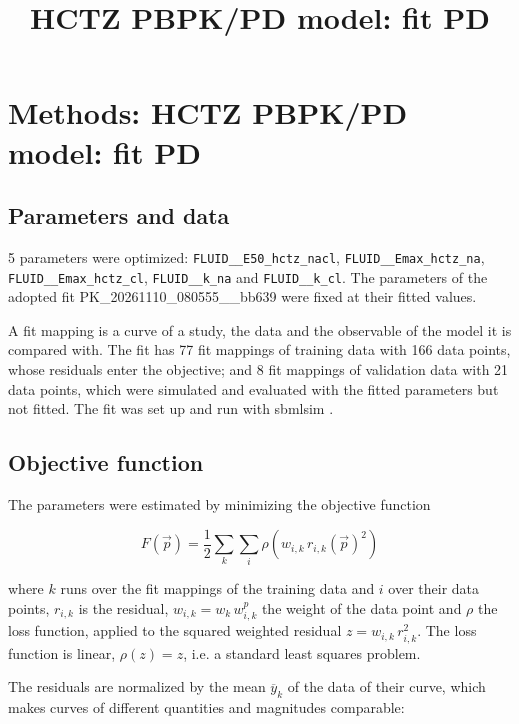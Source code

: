 \documentclass{article}
\title{HCTZ PBPK/PD model: fit PD}
\date{}
\begin{document}
\maketitle

\section{Methods: HCTZ PBPK/PD model: fit PD}

\subsection{Parameters and data}

5 parameters were optimized: \texttt{FLUID\_\_E50\_hctz\_nacl}, \texttt{FLUID\_\_Emax\_hctz\_na}, \texttt{FLUID\_\_Emax\_hctz\_cl}, \texttt{FLUID\_\_k\_na} and \texttt{FLUID\_\_k\_cl}. The parameters of the adopted fit PK\_20261110\_080555\_\_bb639 were fixed at their fitted values.

A fit mapping is a curve of a study, the data and the observable of the model it is compared with. The fit has 77 fit mappings of training data with 166 data points, whose residuals enter the objective; and 8 fit mappings of validation data with 21 data points, which were simulated and evaluated with the fitted parameters but not fitted. The fit was set up and run with sbmlsim \cite{Koenig2026_sbmlsim}.

\subsection{Objective function}

The parameters were estimated by minimizing the objective function

\begin{equation}
F(\vec{p}) = \frac{1}{2} \sum_{k} \sum_{i} \rho\left(w_{i,k}\, r_{i,k}(\vec{p})^2\right)
\end{equation}

where $k$ runs over the fit mappings of the training data and $i$ over their data points, $r_{i,k}$ is the residual, $w_{i,k} = w_k\, w^{p}_{i,k}$ the weight of the data point and $\rho$ the loss function, applied to the squared weighted residual $z = w_{i,k}\, r_{i,k}^2$. The loss function is linear, $\rho(z) = z$, i.e. a standard least squares problem.

The residuals are normalized by the mean $\overline{y}_k$ of the data of their curve, which makes curves of different quantities and magnitudes comparable:
\end{document}
